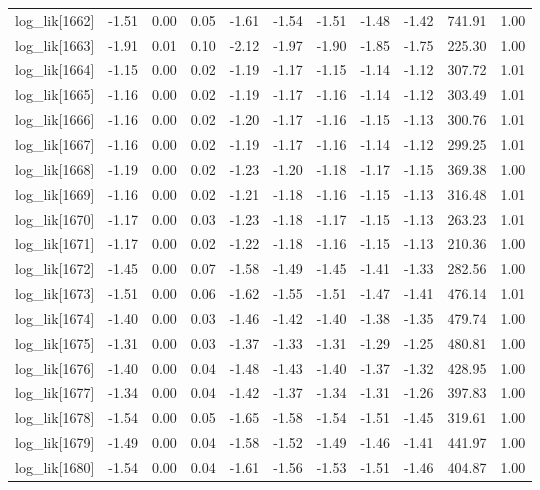 \begin{table}[ht]
\begin{tabular}{rrrrrrrrrrr}
  log\_lik[1662] & -1.51 & 0.00 & 0.05 & -1.61 & -1.54 & -1.51 & -1.48 & -1.42 & 741.91 & 1.00 \\ 
  log\_lik[1663] & -1.91 & 0.01 & 0.10 & -2.12 & -1.97 & -1.90 & -1.85 & -1.75 & 225.30 & 1.00 \\ 
  log\_lik[1664] & -1.15 & 0.00 & 0.02 & -1.19 & -1.17 & -1.15 & -1.14 & -1.12 & 307.72 & 1.01 \\ 
  log\_lik[1665] & -1.16 & 0.00 & 0.02 & -1.19 & -1.17 & -1.16 & -1.14 & -1.12 & 303.49 & 1.01 \\ 
  log\_lik[1666] & -1.16 & 0.00 & 0.02 & -1.20 & -1.17 & -1.16 & -1.15 & -1.13 & 300.76 & 1.01 \\ 
  log\_lik[1667] & -1.16 & 0.00 & 0.02 & -1.19 & -1.17 & -1.16 & -1.14 & -1.12 & 299.25 & 1.01 \\ 
  log\_lik[1668] & -1.19 & 0.00 & 0.02 & -1.23 & -1.20 & -1.18 & -1.17 & -1.15 & 369.38 & 1.00 \\ 
  log\_lik[1669] & -1.16 & 0.00 & 0.02 & -1.21 & -1.18 & -1.16 & -1.15 & -1.13 & 316.48 & 1.01 \\ 
  log\_lik[1670] & -1.17 & 0.00 & 0.03 & -1.23 & -1.18 & -1.17 & -1.15 & -1.13 & 263.23 & 1.01 \\ 
  log\_lik[1671] & -1.17 & 0.00 & 0.02 & -1.22 & -1.18 & -1.16 & -1.15 & -1.13 & 210.36 & 1.00 \\ 
  log\_lik[1672] & -1.45 & 0.00 & 0.07 & -1.58 & -1.49 & -1.45 & -1.41 & -1.33 & 282.56 & 1.00 \\ 
  log\_lik[1673] & -1.51 & 0.00 & 0.06 & -1.62 & -1.55 & -1.51 & -1.47 & -1.41 & 476.14 & 1.01 \\ 
  log\_lik[1674] & -1.40 & 0.00 & 0.03 & -1.46 & -1.42 & -1.40 & -1.38 & -1.35 & 479.74 & 1.00 \\ 
  log\_lik[1675] & -1.31 & 0.00 & 0.03 & -1.37 & -1.33 & -1.31 & -1.29 & -1.25 & 480.81 & 1.00 \\ 
  log\_lik[1676] & -1.40 & 0.00 & 0.04 & -1.48 & -1.43 & -1.40 & -1.37 & -1.32 & 428.95 & 1.00 \\ 
  log\_lik[1677] & -1.34 & 0.00 & 0.04 & -1.42 & -1.37 & -1.34 & -1.31 & -1.26 & 397.83 & 1.00 \\ 
  log\_lik[1678] & -1.54 & 0.00 & 0.05 & -1.65 & -1.58 & -1.54 & -1.51 & -1.45 & 319.61 & 1.00 \\ 
  log\_lik[1679] & -1.49 & 0.00 & 0.04 & -1.58 & -1.52 & -1.49 & -1.46 & -1.41 & 441.97 & 1.00 \\ 
  log\_lik[1680] & -1.54 & 0.00 & 0.04 & -1.61 & -1.56 & -1.53 & -1.51 & -1.46 & 404.87 & 1.00 \\ 

\end{tabular}
\end{table}
